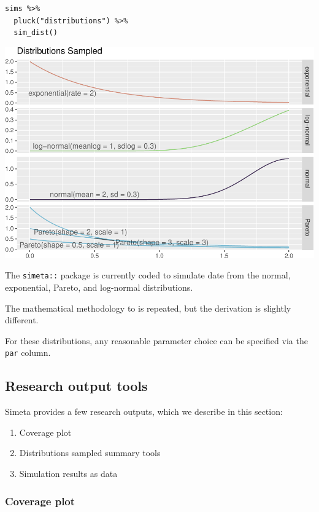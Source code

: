 \documentclass[
]{article}
\providecommand{\tightlist}{%
  \setlength{\itemsep}{0pt}\setlength{\parskip}{0pt}}
\begin{document}
\begin{verbatim}
sims %>% 
  pluck("distributions") %>% 
  sim_dist()
\end{verbatim}

\includegraphics{simeta-demo_files/figure-latex/default parameters vis-2.pdf}

The \texttt{simeta::} package is currently coded to simulate date from
the normal, exponential, Pareto, and log-normal distributions.

The mathematical methodology to is repeated, but the derivation is
slightly different.

For these distributions, any reasonable parameter choice can be
specified via the \texttt{par} column.

\hypertarget{research-output-tools}{%
\subsection{Research output tools}\label{research-output-tools}}

Simeta provides a few research outputs, which we describe in this
section:

\begin{enumerate}
\def\labelenumi{\arabic{enumi}.}
\tightlist
\item
  Coverage plot
\item
  Distributions sampled summary tools
\item
  Simulation results as data
\end{enumerate}

\hypertarget{coverage-plot}{%
\subsubsection{Coverage plot}\label{coverage-plot}}
\end{document}
